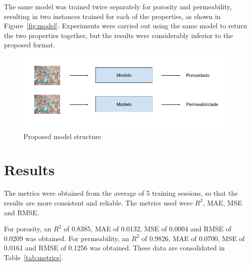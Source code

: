 \documentclass[a4paper,fleqn]{cas-sc}
\begin{document}
The same model was trained twice separately for porosity and permeability, resulting in two instances trained for each of the properties, as shown in Figure~\ref{fig:model}. Experiments were carried out using the same model to return the two properties together, but the results were considerably inferior to the proposed format.

\begin{figure}[h!]
	\caption{Proposed model structure}
	\label{fig:modelo}
	\centering%
	\begin{minipage}{0.7\textwidth}
		\includegraphics[width=\textwidth]{images/estrutura_modelo_cnn.png}
	\end{minipage}
\end{figure}
\section{Results}

The metrics were obtained from the average of 5 training sessions, so that the results are more consistent and reliable. The metrics used were $R^2$, MAE, MSE and RMSE.

For porosity, an $R^2$ of 0.8385, MAE of 0.0132, MSE of 0.0004 and RMSE of 0.0209 was obtained. For permeability, an $R^2$ of 0.9826, MAE of 0.0700, MSE of 0.0161 and RMSE of 0.1256 was obtained. These data are consolidated in Table~\ref{tab:metrics}.
\end{document}
